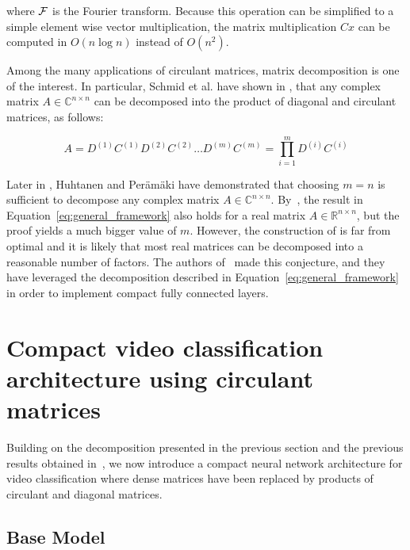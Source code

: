 \documentclass[runningheads]{llncs}
\newcommand{\F}{{\ensuremath \mathcal F}}
\begin{document}
\noindent where $\F$ is the Fourier transform. Because this operation can be simplified to a simple element wise vector multiplication, the matrix multiplication $Cx$ can be computed in $O(n \log n)$ instead of $O(n^2)$.

Among the many applications of circulant matrices, matrix decomposition is one of the interest. In particular, Schmid et al. have shown in \cite{muller1998algorithmic,schmid2000decomposing}, that any complex matrix $A \in \mathbb C^{n\times n}$ can be decomposed into the product of diagonal and circulant matrices, as follows: 

\begin{equation}\label{eq:general_framework}
  A = D^{(1)} C^{(1)} D^{(2)} C^{(2)} \dots D^{(m)} C^{(m)} = \prod_{i=1}^{m} D^{(i)} C^{(i)}
\end{equation}

Later in \cite{Huhtanen2015}, Huhtanen and Perämäki have demonstrated that choosing $m=n$ is sufficient to decompose  %
any complex matrix $A \in \mathbb C^{n\times n}$. %
By~\cite{schmid2000decomposing}, the result in Equation~\ref{eq:general_framework} also holds for a real matrix $A \in \mathbb R^{n\times n}$, but the proof yields a much bigger value of $m$. However,  the construction of \cite{schmid2000decomposing} is far from optimal and it is likely that most real matrices can be decomposed into a reasonable number of factors. The authors of~\cite{moczulski2015acdc} made this conjecture, and they have leveraged the decomposition described in Equation~\ref{eq:general_framework} in order to implement compact fully connected layers.


\section{Compact  video classification architecture using circulant matrices}
\label{section:archi}

Building on the decomposition presented in the previous section and the previous results obtained in~\cite{moczulski2015acdc}, we now introduce a compact neural network architecture for video classification where dense matrices have been replaced by products of circulant and diagonal matrices.


\subsection{Base Model}
\end{document}
